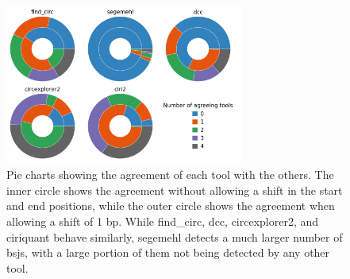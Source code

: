 \begin{figure}[ht] \centering 

    \includegraphics[width=0.7\textwidth]{chapters/4_results_and_discussion/figures/detection/pies.png}
    \caption{Pie charts showing the agreement of each tool with the others.
        The inner circle shows the agreement without allowing a shift in the start and
        end positions, while the outer circle shows the agreement when allowing a shift
        of 1 bp.
        While find\_circ, dcc, circexplorer2, and ciriquant behave similarly, segemehl
        detects a much larger number of \gls{bsj}s, with a large portion of them not
        being detected by any other tool.
    }
    \label{fig:detection_pies}
\end{figure}

